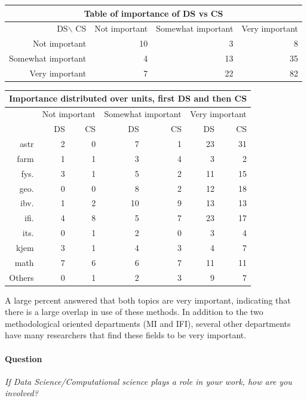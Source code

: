 \documentclass[a4paper,10pt]{article}
\begin{document}
\begin{center}
\begin{tabular}{rrrr}
\multicolumn{4}{c}{Table of importance of DS vs CS}\\
  \hline
 DS$\backslash$ CS& Not important & Somewhat important & Very important \\ 
  \hline
Not important &  10 &   3 &   8 \\ 
  Somewhat important &   4 &  13 &  35 \\ 
  Very important &   7 &  22 &  82 \\ 
   \hline
\end{tabular}
\end{center}

\begin{center}
\begin{tabular}{rrrrrrr}
\hline
\multicolumn{7}{c}{Importance distributed over units, first DS and then CS}\\
  \hline
 &\multicolumn{2}{c}{Not important} &\multicolumn{2}{c}{Somewhat important}&\multicolumn{2}{c}{Very important} \\
 &DS&CS&DS&CS&DS&CS\\
  \hline
astr &   2 &   0 &   7 &   1 &  23 &  31 \\ 
  farm &   1 &   1 &   3 &   4 &   3 &   2 \\ 
  fys. &   3 &   1 &   5 &   2 &  11 &  15 \\ 
  geo. &   0 &   0 &   8 &   2 &  12 &  18 \\ 
  ibv. &   1 &   2 &  10 &   9 &  13 &  13 \\ 
  ifi. &   4 &   8 &   5 &   7 &  23 &  17 \\ 
  its. &   0 &   1 &   2 &   0 &   3 &   4 \\ 
  kjem &   3 &   1 &   4 &   3 &   4 &   7 \\ 
  math &   7 &   6 &   6 &   7 &  11 &  11 \\ 
  Others &   0 &   1 &   2 &   3 &   9 &   7 \\ 
   \hline
\end{tabular}
\end{center}

A large percent answered that both topics are very important, indicating that there is a large overlap in use of these methods. In addition to the two methodological oriented departments (MI and IFI), several other departments have many researchers that find these fields to be very important.

\paragraph{Question} \textit{If Data Science/Computational science plays a role in your work, how are you involved?}\\
\end{document}
